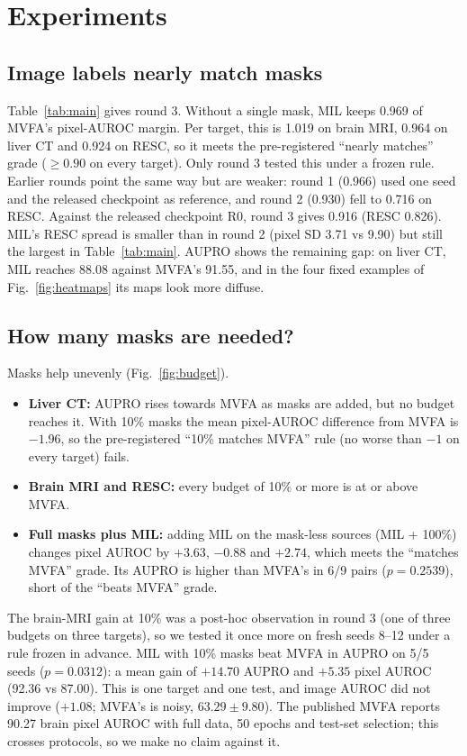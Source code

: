 \documentclass[10pt,twocolumn,letterpaper]{article}
\begin{document}
\section{Experiments}
\label{sec:experiments}
\subsection{Image labels nearly match masks}
Table~\ref{tab:main} gives round 3. Without a single mask, MIL keeps 0.969 of MVFA's pixel-AUROC margin. Per target, this is 1.019 on brain MRI, 0.964 on liver CT and 0.924 on RESC, so it meets the pre-registered ``nearly matches'' grade ($\ge 0.90$ on every target). Only round 3 tested this under a frozen rule. Earlier rounds point the same way but are weaker: round 1 (0.966) used one seed and the released checkpoint as reference, and round 2 (0.930) fell to 0.716 on RESC. Against the released checkpoint R0, round 3 gives 0.916 (RESC 0.826). MIL's RESC spread is smaller than in round 2 (pixel SD 3.71 vs 9.90) but still the largest in Table~\ref{tab:main}. AUPRO shows the remaining gap: on liver CT, MIL reaches 88.08 against MVFA's 91.55, and in the four fixed examples of Fig.~\ref{fig:heatmaps} its maps look more diffuse.

\subsection{How many masks are needed?}
Masks help unevenly (Fig.~\ref{fig:budget}).
\begin{itemize}
\item \textbf{Liver CT:} AUPRO rises towards MVFA as masks are added, but no budget reaches it. With 10\% masks the mean pixel-AUROC difference from MVFA is $-1.96$, so the pre-registered ``10\% matches MVFA'' rule (no worse than $-1$ on every target) fails.
\item \textbf{Brain MRI and RESC:} every budget of 10\% or more is at or above MVFA.
\item \textbf{Full masks plus MIL:} adding MIL on the mask-less sources (MIL + 100\%) changes pixel AUROC by $+3.63$, $-0.88$ and $+2.74$, which meets the ``matches MVFA'' grade. Its AUPRO is higher than MVFA's in 6/9 pairs ($p=0.2539$), short of the ``beats MVFA'' grade.
\end{itemize}
The brain-MRI gain at 10\% was a post-hoc observation in round 3 (one of three budgets on three targets), so we tested it once more on fresh seeds 8--12 under a rule frozen in advance. MIL with 10\% masks beat MVFA in AUPRO on 5/5 seeds ($p=0.0312$): a mean gain of $+14.70$ AUPRO and $+5.35$ pixel AUROC (92.36 vs 87.00). This is one target and one test, and image AUROC did not improve ($+1.08$; MVFA's is noisy, $63.29\pm9.80$). The published MVFA reports 90.27 brain pixel AUROC with full data, 50 epochs and test-set selection; this crosses protocols, so we make no claim against it.
\end{document}
